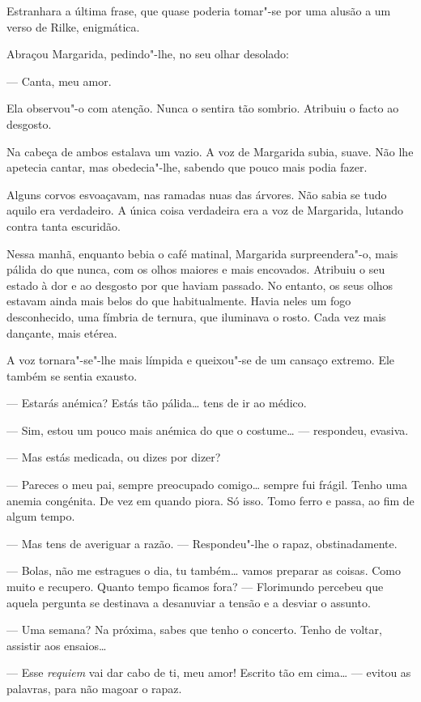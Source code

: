Estranhara a última frase, que quase poderia tomar"-se por uma alusão a
um verso de Rilke, enigmática.

Abraçou Margarida, pedindo"-lhe, no seu olhar desolado:

--- Canta, meu amor.

Ela observou"-o com atenção. Nunca o sentira tão sombrio. Atribuiu o
facto ao desgosto.

Na cabeça de ambos estalava um vazio. A voz de Margarida subia, suave.
Não lhe apetecia cantar, mas obedecia"-lhe, sabendo que pouco mais podia
fazer.

Alguns corvos esvoaçavam, nas ramadas nuas das árvores. Não sabia se
tudo aquilo era verdadeiro. A única coisa verdadeira era a voz de
Margarida, lutando contra tanta escuridão.

Nessa manhã, enquanto bebia o café matinal, Margarida surpreendera"-o,
mais pálida do que nunca, com os olhos maiores e mais encovados.
Atribuiu o seu estado à dor e ao desgosto por que haviam passado. No
entanto, os seus olhos estavam ainda mais belos do que habitualmente.
Havia neles um fogo desconhecido, uma fímbria de ternura, que iluminava
o rosto. Cada vez mais dançante, mais etérea.

A voz tornara"-se"-lhe mais límpida e queixou"-se de um cansaço extremo.
Ele também se sentia exausto.

--- Estarás anémica? Estás tão pálida\ldots{} tens de ir ao médico.

--- Sim, estou um pouco mais anémica do que o costume\ldots{} --- respondeu,
evasiva.

--- Mas estás medicada, ou dizes por dizer?

--- Pareces o meu pai, sempre preocupado comigo\ldots{} sempre fui frágil.
Tenho uma anemia congénita. De vez em quando piora. Só isso. Tomo ferro
e passa, ao fim de algum tempo.

--- Mas tens de averiguar a razão. ---  Respondeu"-lhe o rapaz,
obstinadamente.

--- Bolas, não me estragues o dia, tu também\ldots{} vamos preparar as coisas.
Como muito e recupero. Quanto tempo ficamos fora? ---  Florimundo percebeu
que aquela pergunta se destinava a desanuviar a tensão e a desviar o
assunto.

--- Uma semana? Na próxima, sabes que tenho o concerto. Tenho de voltar,
assistir aos ensaios\ldots{}

--- Esse \emph{requiem }vai dar cabo de ti, meu amor! Escrito tão em
cima\ldots{} --- evitou as palavras, para não magoar o rapaz.

